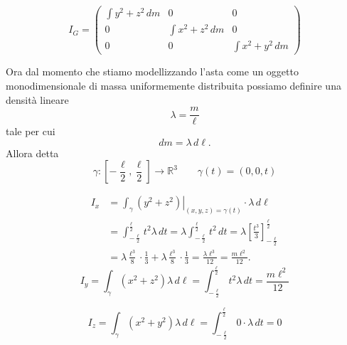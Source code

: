 \begin{example}{}
\[
I_G=
\begin{pmatrix}
\displaystyle \int y^2+z^2\,dm & 0 & 0\\[1.2em]
0 & \displaystyle \int x^2+z^2\,dm & 0\\[1.2em]
0 & 0 & \displaystyle \int x^2+y^2\,dm
\end{pmatrix}
\]

Ora dal momento che stiamo modellizzando l'asta come un oggetto monodimensionale di massa uniformemente distribuita possiamo definire una densità lineare
\[
\lambda=\frac{m}{\ell}
\]
tale per cui
\[
dm=\lambda\,d\ell.
\]
Allora detta
\[
\gamma:\left[-\frac{\ell}{2},\frac{\ell}{2}\right]\to\mathbb{R}^3
\qquad
\gamma(t)=(0,0,t)
\]

\[
\begin{aligned}
I_x
&=
\int_{\gamma}
\left.
\left(y^2+z^2\right)
\right|_{(x,y,z)=\gamma(t)}
\cdot \lambda\,d\ell
\\
&=
\int_{-\frac{\ell}{2}}^{\frac{\ell}{2}}
t^2\lambda\,dt
=
\lambda
\int_{-\frac{\ell}{2}}^{\frac{\ell}{2}}
t^2\,dt
=
\lambda
\left[
\frac{t^3}{3}
\right]_{-\frac{\ell}{2}}^{\frac{\ell}{2}}
\\
&=
\lambda\frac{\ell^3}{8}\cdot\frac{1}{3}
+
\lambda\frac{\ell^3}{8}\cdot\frac{1}{3}
=
\frac{\lambda\ell^3}{12}
=
\frac{m\ell^2}{12}.
\end{aligned}
\]
\[
I_y
=
\int_{\gamma}
\left(x^2+z^2\right)\lambda\,d\ell
=
\int_{-\frac{\ell}{2}}^{\frac{\ell}{2}}
t^2\lambda\,dt
=
\frac{m\ell^2}{12}
\]

\[
I_z
=
\int_{\gamma}
\left(x^2+y^2\right)\lambda\,d\ell
=
\int_{-\frac{\ell}{2}}^{\frac{\ell}{2}}
0\cdot \lambda\,dt
=
0
\]

\begin{center}
\end{center}
\end{example}
